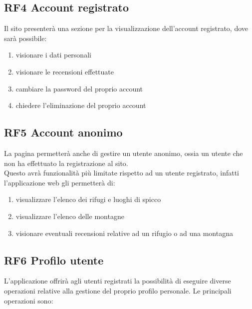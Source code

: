 \documentclass[a4paper,12pt]{article}
\begin{document}
\subsection*{RF4 Account registrato}
 Il sito presenterà una sezione per la visualizzazione dell'account registrato, dove sarà possibile:
 \begin{enumerate} [leftmargin=40pt]
     \item visionare i dati personali
     \item visionare le recensioni effettuate
     \item cambiare la password del proprio account
     \item chiedere l'eliminazione del proprio account
 \end{enumerate}


 \subsection*{RF5 Account anonimo}
 La pagina permetterà anche di gestire un utente anonimo, ossia un utente che non ha effettuato la registrazione al sito.\\
 Questo avrà funzionalità più limitate rispetto ad un utente registrato, infatti l'applicazione web gli permetterà di:
 \begin{enumerate} [leftmargin=40pt]
  \item visualizzare l'elenco dei rifugi e luoghi di spicco
  \item visualizzare l'elenco delle montagne
  \item visionare eventuali recensioni relative ad un rifugio o ad una montagna
\end{enumerate}

 
\subsection*{RF6 Profilo utente}
L'applicazione offrirà agli utenti registrati la possibilità di eseguire diverse operazioni relative alla gestione del proprio profilo personale. Le principali operazioni sono: 
\end{document}
